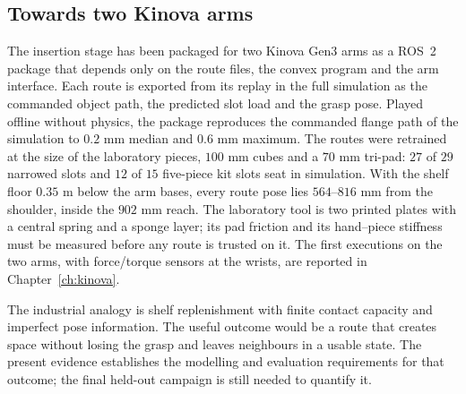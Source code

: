 
\subsection{Towards two Kinova arms}

The insertion stage has been packaged for two Kinova Gen3 arms as a ROS~2 package that depends only on the route files, the convex program and the arm interface. Each route is exported from its replay in the full simulation as the commanded object path, the predicted slot load and the grasp pose. Played offline without physics, the package reproduces the commanded flange path of the simulation to $0.2$ mm median and $0.6$ mm maximum. The routes were retrained at the size of the laboratory pieces, $100$ mm cubes and a $70$ mm tri-pad: $27$ of $29$ narrowed slots and $12$ of $15$ five-piece kit slots seat in simulation. With the shelf floor $0.35$ m below the arm bases, every route pose lies $564$--$816$ mm from the shoulder, inside the $902$ mm reach. The laboratory tool is two printed plates with a central spring and a sponge layer; its pad friction and its hand--piece stiffness must be measured before any route is trusted on it. The first executions on the two arms, with force/torque sensors at the wrists, are reported in Chapter~\ref{ch:kinova}.

The industrial analogy is shelf replenishment with finite contact capacity and imperfect pose information. The useful outcome would be a route that creates space without losing the grasp and leaves neighbours in a usable state. The present evidence establishes the modelling and evaluation requirements for that outcome; the final held-out campaign is still needed to quantify it.

